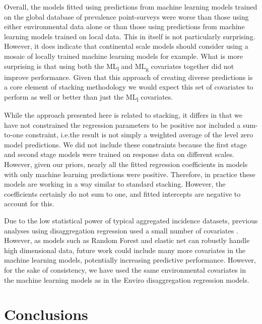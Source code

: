 \documentclass[review]{elsarticle}
\begin{document}


Overall, the models fitted using predictions from machine learning models trained on the global database of prevalence point-surveys were worse than those using either environmental data alone or than those using predictions from machine learning models trained on local data.
This in itself is not particularly surprising.
However, it does indicate that continental scale models should consider using a mosaic of locally trained machine learning models for example.
What is more surprising is that using both the ML\textsubscript{l} and ML\textsubscript{g} covariates together did not improve performance.
Given that this approach of creating diverse predictions is a core element of stacking methodology we would expect this set of covariates to perform as well or better than just the ML\textsubscript{l} covariates.

While the approach presented here is related to stacking, it differs in that we have not constrained the regression parameters to be positive nor included a sum-to-one constraint, i.e.\thinspace the result is not simply a weighted average of the level zero model predictions.
We did not include these constraints because the first stage and second stage models were trained on response data on different scales.
However, given our priors, nearly all the fitted regression coefficients in models with only machine learning predictions were positive.
Therefore, in practice these models are working in a way similar to standard stacking.
However, the coefficients certainly do not sum to one, and fitted intercepts are negative to account for this.


Due to the low statistical power of typical aggregated incidence datasets, previous analyses using disaggregation regression used a small number of covariates \citep{sturrock2014fine}.
However, as models such as Random Forest and elastic net can robustly handle high dimensional data, future work could include many more covariates in the machine learning models, potentially increasing predictive performance.
However, for the sake of consistency, we have used the same environmental covariates in the machine learning models as in the Enviro disaggregation regression models.



\section{Conclusions}
\end{document}
